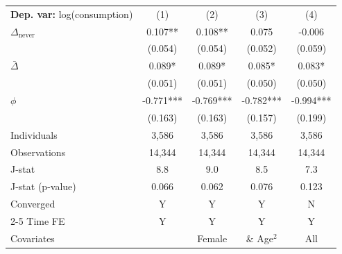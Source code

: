 \begin{tabular}{l cccc} \toprule  \textbf{Dep. var:}  log(consumption) 
                    &\multicolumn{1}{c}{(1)}   &\multicolumn{1}{c}{(2)}   &\multicolumn{1}{c}{(3)}   &\multicolumn{1}{c}{(4)}   \\

\addlinespace
$\Delta_{\text{never}}$&       0.107** &       0.108** &       0.075   &      -0.006   \\
                    &     (0.054)   &     (0.054)   &     (0.052)   &     (0.059)   \\

\addlinespace
$\bar{\Delta}$      &       0.089*  &       0.089*  &       0.085*  &       0.083*  \\
                    &     (0.051)   &     (0.051)   &     (0.050)   &     (0.050)   \\

\addlinespace
$\phi$              &      -0.771***&      -0.769***&      -0.782***&      -0.994***\\
                    &     (0.163)   &     (0.163)   &     (0.157)   &     (0.199)   \\
\addlinespace
Individuals         &       3,586   &       3,586   &       3,586   &       3,586   \\
Observations        &      14,344   &      14,344   &      14,344   &      14,344   \\
J-stat              &         8.8   &         9.0   &         8.5   &         7.3   \\
J-stat (p-value)    &       0.066   &       0.062   &       0.076   &       0.123   \\
Converged           &           Y   &           Y   &           Y   &           N   \\
\cmidrule{2-5} Time FE & Y & Y & Y & Y \\ Covariates & & Female & \& Age$^2$ & All \\ \bottomrule \end{tabular}
